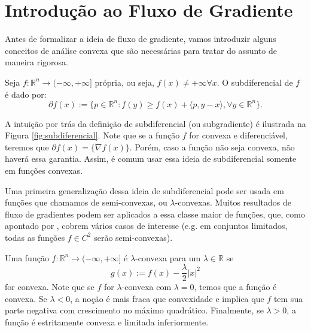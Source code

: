 \section{Introdução ao Fluxo de Gradiente}

Antes de formalizar a ideia de fluxo de gradiente, vamos introduzir alguns
conceitos de análise convexa que são necessárias para tratar
do assunto de maneira rigorosa.

\begin{definition}[Subdiferencial]
    Seja $f:\mathbb R^n \to (-\infty, +\infty]$ própria, ou seja, $f(x) \neq +\infty \forall x$.
    O subdiferencial de $f$ é dado por:
    \begin{equation}
        \partial f(x) := \{p \in \mathbb R^n:
        f(y) \geq f(x) + \langle p, y-x\rangle, \forall y \in \mathbb R^n
        \}.
    \end{equation}
\end{definition}
A intuição por trás da definição
de subdiferencial (ou subgradiente) é ilustrada na Figura \ref{fig:subdiferencial}.
Note que se a função $f$ for convexa e diferenciável, teremos que $\partial f(x) = \{\nabla f(x)\}$.
Porém, caso a função não seja convexa, não haverá essa garantia. Assim, é comum usar essa ideia de
subdiferencial somente em funções convexas.

Uma primeira generalização dessa ideia de subdiferencial pode ser usada em funções que chamamos
de semi-convexas, ou $\lambda$-convexas. Muitos resultados de fluxo de gradientes podem ser
aplicados a essa classe maior de funções, que, como apontado por \citet{santambrogio2017euclidean},
cobrem vários casos de interesse (e.g. em conjuntos limitados,
todas as funções $f \in C^2$ serão semi-convexas).

\begin{definition}
    Uma função $f:\mathbb R^n \to (-\infty,+\infty]$ é $\lambda$-convexa
    para um $\lambda\in\mathbb R$ se
    \begin{equation}
        g(x):=f(x) -\frac{\lambda}{2}|x|^2
    \end{equation}
    for convexa.
    Note que se $f$ for $\lambda$-convexa com $\lambda =0$, temos que a função é convexa.
    Se $\lambda <0$, a noção é mais fraca que convexidade e implica que
    $f$ tem sua parte negativa com crescimento no máximo quadrático.
    Finalmente, se $\lambda > 0$, a função é estritamente convexa e
    limitada inferiormente.
\end{definition}

